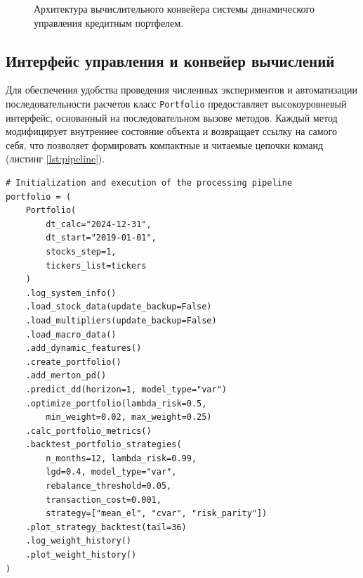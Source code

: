 \documentclass[]{article}
\begin{document}
\begin{figure}[h!]
{}
		\caption{Архитектура вычислительного конвейера системы динамического управления
		         кредитным портфелем.}
		\label{fig:architecture}
	\end{figure}

	\subsection{Интерфейс управления и конвейер вычислений}

	Для обеспечения удобства проведения численных экспериментов и автоматизации последовательности расчетов класс
	\texttt{Portfolio} предоставляет высокоуровневый интерфейс, основанный на последовательном вызове методов. Каждый
	метод модифицирует внутреннее состояние объекта и возвращает ссылку на самого себя, что
	позволяет формировать компактные и читаемые цепочки команд (листинг \ref{lst:pipeline}).

\begin{lstlisting}[style=terminal, caption={Пример инициализации и оптимизации портфеля}, label={lst:pipeline}]
# Initialization and execution of the processing pipeline
portfolio = (
	Portfolio(
		dt_calc="2024-12-31",
		dt_start="2019-01-01",
		stocks_step=1,
		tickers_list=tickers
	)
	.log_system_info()
	.load_stock_data(update_backup=False)
	.load_multipliers(update_backup=False)
	.load_macro_data()
	.add_dynamic_features()
	.create_portfolio()
	.add_merton_pd()
	.predict_dd(horizon=1, model_type="var")
	.optimize_portfolio(lambda_risk=0.5,
		min_weight=0.02, max_weight=0.25)
	.calc_portfolio_metrics()
	.backtest_portfolio_strategies(
		n_months=12, lambda_risk=0.99,
		lgd=0.4, model_type="var",
		rebalance_threshold=0.05,
		transaction_cost=0.001,
		strategy=["mean_el", "cvar", "risk_parity"])
	.plot_strategy_backtest(tail=36)
	.log_weight_history()
	.plot_weight_history()
)
\end{lstlisting}
\end{document}
